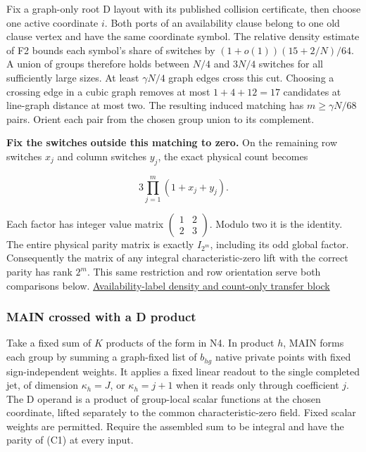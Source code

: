 \documentclass[11pt,a4paper]{article}
\begin{document}
Fix a graph-only root D layout with its published collision certificate,
then choose one active coordinate \(i\). Both ports of an availability
clause belong to one old clause vertex and have the same coordinate
symbol. The relative density estimate of F2 bounds each symbol's share
of switches by \((1+o(1))(15+2/N)/64\). A union of groups therefore
holds between \(N/4\) and \(3N/4\) switches for all sufficiently large
sizes. At least \(\gamma N/4\) graph edges cross this cut. Choosing a
crossing edge in a cubic graph removes at most \(1+4+12=17\) candidates
at line-graph distance at most two. The resulting induced matching has
\(m\ge\gamma N/68\) pairs. Orient each pair from the chosen group union
to its complement.

\textbf{Fix the switches outside this matching to zero.} On the
remaining row switches \(x_j\) and column switches \(y_j\), the exact
physical count becomes

\[
                 3\prod_{j=1}^m(1+x_j+y_j).                       \tag{C2}
\]

Each factor has integer value matrix
\(\left(\begin{smallmatrix}1&2\\2&3\end{smallmatrix}\right)\). Modulo
two it is the identity. The entire physical parity matrix is exactly
\(I_{2^m}\), including its odd global factor. Consequently the matrix of
any integral characteristic-zero lift with the correct parity has rank
\(2^m\). This same restriction and row orientation serve both
comparisons below. \hyperref[v8-section-stronger-family]{Availability-label
density and count-only transfer block}

\subsubsection{MAIN crossed with a D
product}\label{v8-main-crossed-with-a-d-product}

Take a fixed sum of \(K\) products of the form in N4. In product \(h\),
MAIN forms each group by summing a graph-fixed list of \(b_{hg}\) native
private points with fixed sign-independent weights. It applies a fixed
linear readout to the single completed jet, of dimension \(\kappa_h=J\),
or \(\kappa_h=j+1\) when it reads only through coefficient \(j\). The D
operand is a product of group-local scalar functions at the chosen
coordinate, lifted separately to the common characteristic-zero field.
Fixed scalar weights are permitted. Require the assembled sum to be
integral and have the parity of (C1) at every input.
\end{document}
